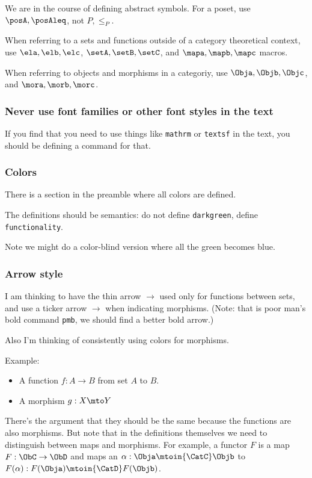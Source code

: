 We are in the course of defining abstract symbols.
For a poset, use $\posA,\posAleq$, not $P,\leq_P$.

When referring to a sets and functions outside of a category theoretical context,   use $\ela,\elb,\elc$, $\setA,\setB,\setC$, and $\mapa,\mapb,\mapc$ macros.

When referring to objects and morphisms in a categoriy,   use $\Obja,\Objb,\Objc$, and $\mora,\morb,\morc$.

\subsubsection*{Never use font families or other font styles in the text}

If you find that you need to use things like \texttt{mathrm} or \texttt{textsf} in the text, you should be defining a command for that.

\subsubsection*{Colors}

There is a section in the preamble where all colors are defined.

The definitions should be semantics: do not define \texttt{darkgreen}, define \texttt{functionality}.

Note we might do a color-blind version where all the green becomes blue.

\subsubsection*{Arrow style}

I am thinking to have the thin arrow $\to$ used only for functions between sets, and use a ticker arrow $\pmb{\to}$ when indicating morphisms.
(Note: that is poor man's bold command \texttt{pmb}, we should find a better bold arrow.)

Also I'm thinking of consistently using colors for morphisms.

Example:
\begin{itemize}
	\item A function $f: A \to B$ from set $A$ to $B$.
	\item A morphism $g: X \mto  Y$
\end{itemize}

There's the argument that they should be the same because the functions are also morphisms.
But note that in the definitions themselves we need to distinguish between maps and morphisms.
For example, a functor $F$ is a map $F: \ObC \to \ObD$ and maps an $\alpha: \Obja \mtoin{\CatC} \Objb $ to $F(\alpha): F(\Obja) \mtoin{\CatD} F(\Objb) $.

